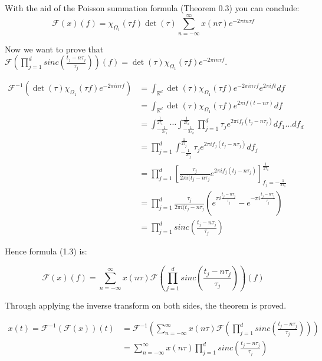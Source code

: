 \documentclass[a4paper, 11pt]{scrreprt}
\newcommand{\RR}{\mathbb{R}}
\newcommand{\FF}{\mathcal{F}}
\begin{document}
With the aid of the Poisson summation formula (Theorem 0.3) you can conclude:
\begin{equation}
\FF(x)(f) = \chi_{\Omega_1}(\tau f) \det(\tau) \sum_{n=-\infty}^\infty x(n\tau)e^{-2\pi i n\tau f}
\end{equation}

\newpage
Now we want to prove that \(\FF\left( \prod_{j=1}^d sinc \left( \frac{t_j-n\tau_j}{\tau_j}\right)\right)(f) = \det(\tau)\chi_{\Omega_1}(\tau f)e^{-2\pi in\tau f}\).

\begin{align*}
\FF^{-1}\left( \det(\tau) \chi_{\Omega_1}(\tau f) e^{-2 \pi i n \tau f}\right) 
&= \int_{\RR^d} \det(\tau) \chi_{\Omega_1}(\tau f) e^{-2 \pi i n \tau f} e^{2 \pi i f t} df \\
&= \int_{\RR^d} \det(\tau) \chi_{\Omega_1}(\tau f) e^{2 \pi i f (t-n\tau) }df \\
&= \int_{-\frac{1}{2\tau_1}}^{\frac{1}{2\tau_1}} \cdots \int_{-\frac{1}{2\tau_d}}^{\frac{1}{2\tau_d}} \prod_{j=1}^d \tau_j e^{2 \pi i f_j(t_j-n \tau_j)}df_1 \ldots df_d \\
&= \prod_{j=1}^d \int_{-\frac{1}{2\tau_j}}^{\frac{1}{2\tau_j}} \tau_j e^{2 \pi i f_j (t_j - n \tau_j)}df_j \\
&= \prod_{j=1}^d \left[  \frac{\tau_j}{2 \pi i (t_j - n \tau_j} e^{2 \pi i f_j (t_j - n \tau_j)} \right]_{f_j = -\frac{1}{2\tau_1}}^{\frac{1}{2\tau_1}} \\
&= \prod_{j=1}^d \frac{\tau_j}{2 \pi i (t_j - n \tau_j} \left( e^{\pi i \frac{t_j - n \tau_j}{\tau_j}} - e^{-\pi i \frac{t_j - n \tau_j}{\tau_j}} \right) \\
&= \prod_{j=1}^d sinc \left( \frac{t_j - n \tau_j}{\tau_j} \right)
\end{align*}

Hence formula (1.3) is:

\[\FF(x)(f) = \sum_{n = -\infty}^\infty x(n\tau) \FF\left(\prod_{j=1}^d sinc \left( \frac{t_j - n \tau_j}{\tau_j} \right) \right)(f)\]

Through applying the inverse transform on both sides, the theorem is proved.

\begin{align*}
x(t) = \FF^{-1}(\FF(x))(t) &= \FF^{-1} \left( \sum_{n = -\infty}^\infty x(n \tau) \FF \left( \prod_{j=1}^d sinc \left( \frac{t_j - n \tau_j}{\tau_j} \right) \right) \right) \\
&= \sum_{n = -\infty}^\infty x(n\tau) \prod_{j=1}^d sinc \left( \frac{t_j - n \tau_j}{\tau_j} \right)
\end{align*}
\end{document}
